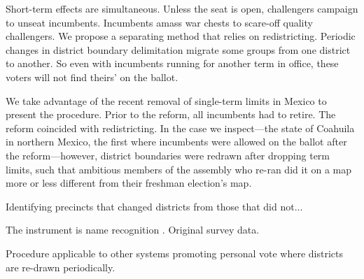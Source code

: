 \documentclass[letter,12pt]{article}
\begin{document}




Short-term effects are simultaneous. Unless the seat is open, challengers campaign to unseat incumbents. Incumbents amass war chests to scare-off quality challengers. We propose a separating method that relies on redistricting. Periodic changes in district boundary delimitation migrate some groups from one district to another. So even with incumbents running for another term in office, these voters will not find theirs' on the ballot.

We take advantage of the recent removal of single-term limits in Mexico to present the procedure. Prior to the reform, all incumbents had to retire. The reform coincided with redistricting. In the case we inspect---the state of Coahuila in northern Mexico, the first where incumbents were allowed on the ballot after the reform---however, district boundaries were redrawn after dropping term limits, such that ambitious members of the assembly who re-ran did it on a map more or less different from their freshman election's map.

Identifying precincts that changed districts from those that did not...

The instrument is name recognition \citep{cain.etal.1987,jacobson.kernell.1983}. Original survey data.

Procedure applicable to other systems promoting personal vote \citep{carey.shugart.1995} where districts are re-drawn periodically. 

\end{document}

